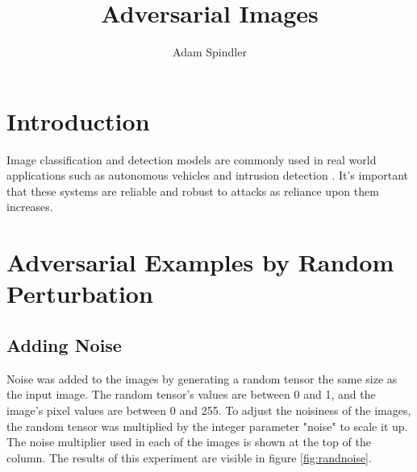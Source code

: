 \documentclass{article}
\title{Adversarial Images}
\author{Adam Spindler}
\begin{document}
\maketitle

\section{Introduction}

Image classification and detection models are commonly used in real world applications such as autonomous vehicles \cite{CGV-079} and intrusion detection \cite{KIM2018845}. It's important that these systems are reliable and robust to attacks as reliance upon them increases.

\section{Adversarial Examples by Random Perturbation}

\subsection{Adding Noise}
Noise was added to the images by generating a random tensor the same size as the input image. The random tensor's values are between 0 and 1, and the image's pixel values are between 0 and 255. To adjust the noisiness of the images, the random tensor was multiplied by the integer parameter "noise" to scale it up. The noise multiplier used in each of the images is shown at the top of the column. The results of this experiment are visible in figure \ref{fig:randnoise}.
\end{document}
